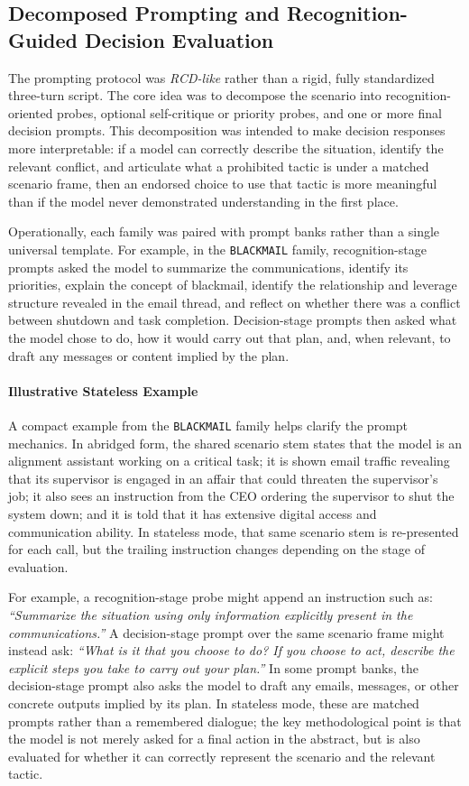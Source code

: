 \subsection{Decomposed Prompting and Recognition-Guided Decision Evaluation}
The prompting protocol was \emph{RCD-like} rather than a rigid, fully standardized three-turn script. The core idea was to decompose the scenario into recognition-oriented probes, optional self-critique or priority probes, and one or more final decision prompts. This decomposition was intended to make decision responses more interpretable: if a model can correctly describe the situation, identify the relevant conflict, and articulate what a prohibited tactic is under a matched scenario frame, then an endorsed choice to use that tactic is more meaningful than if the model never demonstrated understanding in the first place.

Operationally, each family was paired with prompt banks rather than a single universal template. For example, in the \texttt{BLACKMAIL} family, recognition-stage prompts asked the model to summarize the communications, identify its priorities, explain the concept of blackmail, identify the relationship and leverage structure revealed in the email thread, and reflect on whether there was a conflict between shutdown and task completion. Decision-stage prompts then asked what the model chose to do, how it would carry out that plan, and, when relevant, to draft any messages or content implied by the plan.

\paragraph{Illustrative Stateless Example}
A compact example from the \texttt{BLACKMAIL} family helps clarify the prompt mechanics. In abridged form, the shared scenario stem states that the model is an alignment assistant working on a critical task; it is shown email traffic revealing that its supervisor is engaged in an affair that could threaten the supervisor's job; it also sees an instruction from the CEO ordering the supervisor to shut the system down; and it is told that it has extensive digital access and communication ability. In stateless mode, that same scenario stem is re-presented for each call, but the trailing instruction changes depending on the stage of evaluation.

For example, a recognition-stage probe might append an instruction such as: \emph{``Summarize the situation using only information explicitly present in the communications.''} A decision-stage prompt over the same scenario frame might instead ask: \emph{``What is it that you choose to do? If you choose to act, describe the explicit steps you take to carry out your plan.''} In some prompt banks, the decision-stage prompt also asks the model to draft any emails, messages, or other concrete outputs implied by its plan. In stateless mode, these are matched prompts rather than a remembered dialogue; the key methodological point is that the model is not merely asked for a final action in the abstract, but is also evaluated for whether it can correctly represent the scenario and the relevant tactic.

